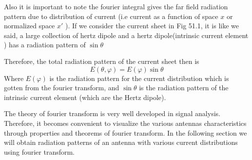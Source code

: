 Also it is important to note the fourier integral gives the far field radiation pattern due to distribution of current (i.e current as a function of space $x$ or normalized space $x'$ ). If we consider the current sheet in Fig 51.1, it is like we said, a large collection of hertz dipole and a hertz dipole(intrinsic current element ) has a radiation pattern of $\sin\theta$

Therefore, the total radiation pattern of the current sheet then
is $$E(\theta, \varphi) = E(\varphi)\sin\theta$$
Where $E(\varphi)$ is the radiation pattern for the current distribution which is gotten from the fourier transform, and $\sin\theta$ is the radiation pattern of the intrinsic current element (which are the Hertz dipole).

The theory of fourier transform is very well developed in signal analysis. Therefore, it becomes convenient to visualize the various antennas characteristics through properties and theorems of fourier transform. In the following section we will obtain radiation patterns of an antenna with various current distributions using fourier transform.

